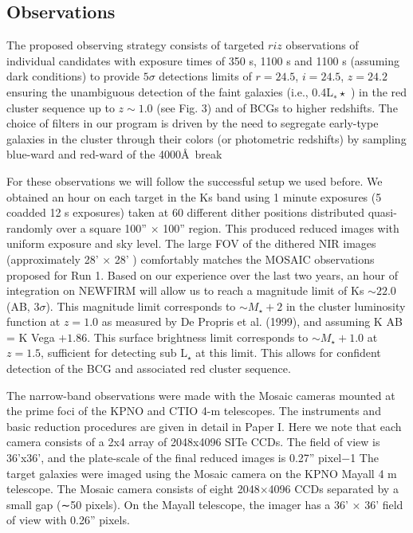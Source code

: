 \documentclass[fleqn,usenatbib]{mnras}
\begin{document}
\subsection{Observations}\label{sec: observations}

The proposed observing strategy consists of targeted $riz$ observations of individual candidates with
exposure times of 350 s, 1100 s and 1100 s (assuming dark conditions) to provide $5\sigma$ detections
limits of $r = 24.5$, $i = 24.5$, $z = 24.2$ ensuring the unambiguous detection of the faint galaxies
(i.e., 0.4L$_∗\star$ ) in the red cluster sequence up to $z \sim 1.0$ (see Fig. 3) and of BCGs to higher redshifts.
The choice of filters in our program is driven by the need to segregate early-type galaxies in the
cluster through their colors (or photometric redshifts) by sampling blue-ward and red-ward of the
4000\AA\ break

For these observations we will follow the successful setup we used before. We obtained an hour
on each target in the Ks band using 1 minute exposures (5 coadded 12 s exposures) taken at
60 different dither positions distributed quasi-randomly over a square 100'' × 100'' region. This
produced reduced images with uniform exposure and sky level. The large FOV of the dithered NIR
images (approximately 28' × 28' ) comfortably matches the MOSAIC observations proposed for Run
1.
Based on our experience over the last two years, an hour of integration on NEWFIRM will allow us
to reach a magnitude limit of Ks $\sim 22.0$ (AB, $3\sigma$). This magnitude limit corresponds to $\sim M_{\star} + 2$
in the cluster luminosity function at $z = 1.0$ as measured by De Propris et al. (1999), and assuming
K AB = K Vega $+ 1.86$. This surface brightness limit corresponds to $\sim M_{\star} + 1.0$ at $z = 1.5$, sufficient
for detecting sub L$_{\star}$ at this limit. This allows for confident detection of the BCG and associated red
cluster sequence.

The narrow-band observations were made with the Mosaic cameras mounted at the
prime foci of the KPNO and CTIO 4-m telescopes. The instruments and basic reduction
procedures are given in detail in Paper I. Here we note that each camera consists of a 2x4
array of 2048x4096 SITe CCDs. The field of view is 36’x36’, and the plate-scale of the
final reduced images is 0.27” pixel−1
The target galaxies were imaged using the Mosaic camera on
the KPNO Mayall 4 m telescope. The Mosaic camera consists of
eight 2048×4096 CCDs separated by a small gap (∼50 pixels).
On the Mayall telescope, the imager has a 36' × 36' field of
view with 0.26'' pixels.
\end{document}
